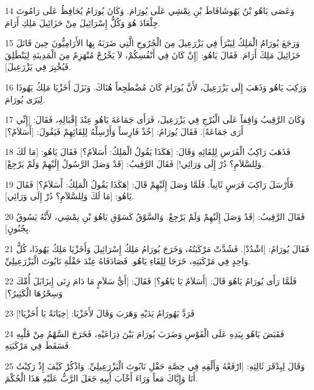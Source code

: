 \par 14 وَعَصَى يَاهُو بْنُ يَهُوشَافَاطَ بْنِ نِمْشِي عَلَى يُورَامَ. وَكَانَ يُورَامُ يُحَافِظُ عَلَى رَامُوتَ جِلْعَادَ هُوَ وَكُلُّ إِسْرَائِيلَ مِنْ حَزَائِيلَ مَلِكِ أَرَامَ.
\par 15 وَرَجَعَ يُورَامُ الْمَلِكُ لِيَبْرَأَ فِي يَزْرَعِيلَ مِنَ الْجُرُوحِ الَّتِي ضَرَبَهُ بِهَا الأَرَامِيُّونَ حِينَ قَاتَلَ حَزَائِيلَ مَلِكَ أَرَامَ. فَقَالَ يَاهُو: [إِنْ كَانَ فِي أَنْفُسِكُمْ، لاَ يَخْرُجْ مُنْهَزِمٌ مِنَ الْمَدِينَةِ لِيَنْطَلِقَ فَيُخْبِرَ فِي يَزْرَعِيلَ].
\par 16 وَرَكِبَ يَاهُو وَذَهَبَ إِلَى يَزْرَعِيلَ، لأَنَّ يُورَامَ كَانَ مُضْطَجِعاً هُنَاكَ. وَنَزَلَ أَخَزْيَا مَلِكُ يَهُوذَا لِيَرَى يُورَامَ.
\par 17 وَكَانَ الرَّقِيبُ وَاقِفاً عَلَى الْبُرْجِ فِي يَزْرَعِيلَ، فَرَأَى جَمَاعَةَ يَاهُو عِنْدَ إِقْبَالِهِ، فَقَالَ: [إِنِّي أَرَى جَمَاعَةً]. فَقَالَ يُورَامُ: [خُذْ فَارِساً وَأَرْسِلْهُ لِلِقَائِهِمْ فَيَقُولَ: [أَسَلاَمٌ؟]
\par 18 فَذَهَبَ رَاكِبُ الْفَرَسِ لِلِقَائِهِ وَقَالَ: [هَكَذَا يَقُولُ الْمَلِكُ: أَسَلاَمٌ؟] فَقَالَ يَاهُو: [مَا لَكَ وَلِلسَّلاَمِ؟ دُرْ إِلَى وَرَائِي!] فَقَالَ الرَّقِيبُ: [قَدْ وَصَلَ الرَّسُولُ إِلَيْهِمْ وَلَمْ يَرْجِعْ].
\par 19 فَأَرْسَلَ رَاكِبَ فَرَسٍ ثَانِياً. فَلَمَّا وَصَلَ إِلَيْهِمْ قَالَ: [هَكَذَا يَقُولُ الْمَلِكُ: أَسَلاَمٌ؟] فَقَالَ يَاهُو: [مَا لَكَ وَلِلسَّلاَمِ؟ دُرْ إِلَى وَرَائِي].
\par 20 فَقَالَ الرَّقِيبُ: [قَدْ وَصَلَ إِلَيْهِمْ وَلَمْ يَرْجِعْ. وَالسَّوْقُ كَسَوْقِ يَاهُوَ بْنِ نِمْشِي، لأَنَّهُ يَسُوقُ بِجُنُونٍ].
\par 21 فَقَالَ يُورَامُ: [اشْدُدْ]. فَشُدَّتْ مَرْكَبَتُهُ، وَخَرَجَ يُورَامُ مَلِكُ إِسْرَائِيلَ وَأَخَزْيَا مَلِكُ يَهُوذَا، كُلُّ وَاحِدٍ فِي مَرْكَبَتِهِ، خَرَجَا لِلِقَاءِ يَاهُو. فَصَادَفَاهُ عِنْدَ حَقْلَةِ نَابُوتَ الْيَزْرَعِيلِيِّ.
\par 22 فَلَمَّا رَأَى يُورَامُ يَاهُوَ قَالَ: [أَسَلاَمٌ يَا يَاهُو؟] فَقَالَ: [أَيُّ سَلاَمٍ مَا دَامَ زِنَى إِيزَابَلَ أُمِّكَ وَسِحْرُهَا الْكَثِيرُ؟]
\par 23 فَرَدَّ يَهُورَامُ يَدَيْهِ وَهَرَبَ وَقَالَ لأَخَزْيَا: [خِيَانَةً يَا أَخَزْيَا!]
\par 24 فَقَبَضَ يَاهُو بِيَدِهِ عَلَى الْقَوْسِ وَضَرَبَ يُورَامَ بَيْنَ ذِرَاعَيْهِ، فَخَرَجَ السَّهْمُ مِنْ قَلْبِهِ فَسَقَطَ فِي مَرْكَبَتِهِ.
\par 25 وَقَالَ لِبِدْقَرَ ثَالِثِهِ: [ارْفَعْهُ وَأَلْقِهِ فِي حِصَّةِ حَقْلِ نَابُوتَ الْيَزْرَعِيلِيِّ. وَاذْكُرْ كَيْفَ إِذْ رَكِبْتُ أَنَا وَإِيَّاكَ مَعاً وَرَاءَ أَخْآبَ أَبِيهِ جَعَلَ الرَّبُّ عَلَيْهِ هَذَا الْحُكْمَ.

